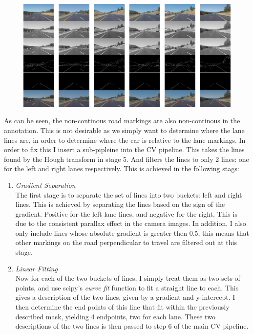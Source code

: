 \documentclass[letterpaper,12pt]{article}
\begin{document}
\FloatBarrier
\begin{figure}
\centering
\includegraphics[width=0.9\columnwidth]{fig1_clean.pdf}
\label{fig:figure}
\end{figure}
\FloatBarrier
\noindent As can be seen, the non-continous road markings are also non-continous in the annotation. This is not desirable as we simply want to determine where the lane lines are, in order to determine where the car is relative to the lane markings. In order to fix this I insert a sub-pipleine into the CV pipeline. This takes the lines found by the Hough transform in stage 5. And filters the lines to only 2 lines: one for the left and right lanes respectively. This is achieved in the following stags:
\begin{enumerate}

 \item \textit{Gradient Separation}\\
The first stage is to separate the set of lines into two buckets: left and right lines. This is achieved by separating the lines based on the sign of the gradient.  Positive for the left lane lines, and negative for the right. This is due to the consistent parallax effect in the camera images. In addition, I also only include lines whose absolute gradient is greater then 0.5, this means that other markings on the road perpendicular to travel are filtered out at this stage.
 \item \textit{Linear Fitting}\\
Now for each of the two buckets of lines, I simply treat them as two sets of points, and use scipy's \textit{curve fit} function to fit a straight line to each. This gives a description of the two lines, given by a gradient and y-intercept. I then determine the end points of this line that fit within the previously described mask, yielding 4 endpoints, two for each lane. These two descriptions of the two lines is then passed to step 6 of the main CV pipeline.
\end{enumerate}
\end{document}
